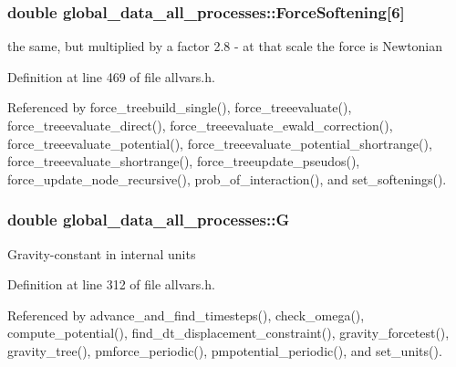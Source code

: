 \hypertarget{structglobal__data__all__processes_a2f875884085b35ff64047e46f5348be4}{
\subsubsection[{ForceSoftening}]{\setlength{\rightskip}{0pt plus 5cm}double {\bf global\_\-data\_\-all\_\-processes::ForceSoftening}\mbox{[}6\mbox{]}}}
\label{structglobal__data__all__processes_a2f875884085b35ff64047e46f5348be4}
the same, but multiplied by a factor 2.8 -\/ at that scale the force is Newtonian 

Definition at line 469 of file allvars.h.



Referenced by force\_\-treebuild\_\-single(), force\_\-treeevaluate(), force\_\-treeevaluate\_\-direct(), force\_\-treeevaluate\_\-ewald\_\-correction(), force\_\-treeevaluate\_\-potential(), force\_\-treeevaluate\_\-potential\_\-shortrange(), force\_\-treeevaluate\_\-shortrange(), force\_\-treeupdate\_\-pseudos(), force\_\-update\_\-node\_\-recursive(), prob\_\-of\_\-interaction(), and set\_\-softenings().

\hypertarget{structglobal__data__all__processes_a1250b5c6e116b576ff09cbcd928d2063}{
\subsubsection[{G}]{\setlength{\rightskip}{0pt plus 5cm}double {\bf global\_\-data\_\-all\_\-processes::G}}}
\label{structglobal__data__all__processes_a1250b5c6e116b576ff09cbcd928d2063}
Gravity-\/constant in internal units 

Definition at line 312 of file allvars.h.



Referenced by advance\_\-and\_\-find\_\-timesteps(), check\_\-omega(), compute\_\-potential(), find\_\-dt\_\-displacement\_\-constraint(), gravity\_\-forcetest(), gravity\_\-tree(), pmforce\_\-periodic(), pmpotential\_\-periodic(), and set\_\-units().

